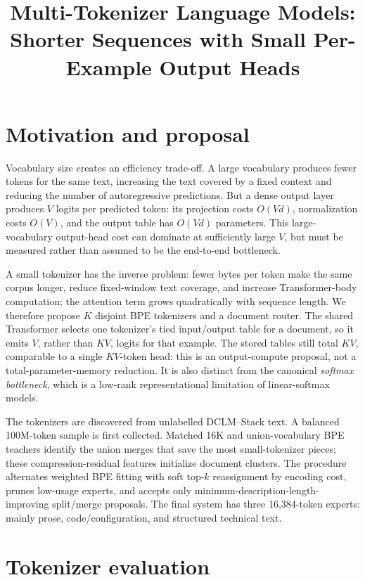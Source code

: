 \documentclass[10pt]{article}
\title{Multi-Tokenizer Language Models: Shorter Sequences with Small Per-Example Output Heads}
\date{}
\begin{document}
\maketitle
\vspace{-1.5em}

\section{Motivation and proposal}

Vocabulary size creates an efficiency trade-off. A large vocabulary produces fewer tokens for the same text, increasing the text covered by a fixed context and reducing the number of autoregressive predictions. But a dense output layer produces $V$ logits per predicted token: its projection costs $O(Vd)$, normalization costs $O(V)$, and the output table has $O(Vd)$ parameters. This large-vocabulary output-head cost can dominate at sufficiently large $V$, but must be measured rather than assumed to be the end-to-end bottleneck.

A small tokenizer has the inverse problem: fewer bytes per token make the same corpus longer, reduce fixed-window text coverage, and increase Transformer-body computation; the attention term grows quadratically with sequence length. We therefore propose $K$ disjoint BPE tokenizers and a document router. The shared Transformer selects one tokenizer's tied input/output table for a document, so it emits $V$, rather than $KV$, logits for that example. The stored tables still total $KV$, comparable to a single $KV$-token head: this is an output-compute proposal, not a total-parameter-memory reduction. It is also distinct from the canonical \emph{softmax bottleneck}, which is a low-rank representational limitation of linear-softmax models.

The tokenizers are discovered from unlabelled DCLM--Stack text. A balanced 100M-token sample is first collected. Matched 16K and union-vocabulary BPE teachers identify the union merges that save the most small-tokenizer pieces; these compression-residual features initialize document clusters. The procedure alternates weighted BPE fitting with soft top-$k$ reassignment by encoding cost, prunes low-usage experts, and accepts only minimum-description-length-improving split/merge proposals. The final system has three 16,384-token experts: mainly prose, code/configuration, and structured technical text.

\section{Tokenizer evaluation}
\end{document}
